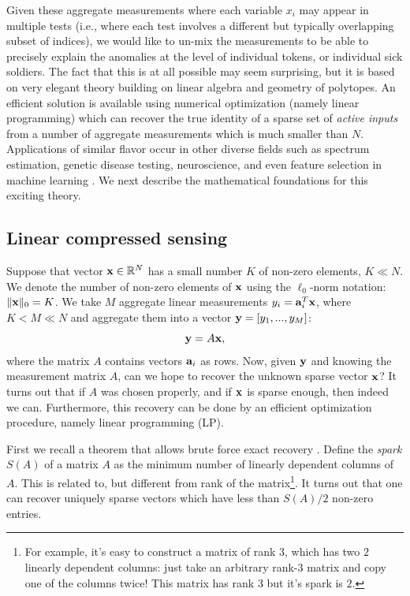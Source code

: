 Given these aggregate measurements where each variable $x_i$ may appear in multiple tests
(i.e., where each test involves a different but typically overlapping subset of indices), we would like to un-mix the
measurements to be able to precisely explain the anomalies at the level of individual tokens,
or individual sick soldiers.  The fact that this is at all possible may seem surprising, but it
is based on very elegant theory building on linear algebra and geometry of polytopes.  An
efficient solution is available using numerical optimization (namely linear programming) which
can recover the true identity of a sparse set of {\em active inputs} from a number of aggregate
measurements which is much smaller than $N$. Applications of similar flavor occur in
other diverse fields such as spectrum estimation, genetic disease testing, neuroscience, and even feature selection in machine learning \cite{rish2014sparse}. We next describe the mathematical foundations for this exciting theory.

\subsection{ Linear compressed sensing}

Suppose that  vector $\mathbf{x} \in \mathbb{R}^N$ has a small number $K$ of non-zero elements, $K \ll N$.
We denote the number of non-zero elements of $\mathbf{x}$ using the $\ell_0$-norm notation:
$\Vert \mathbf{x} \Vert_0 = K$.   We take $M$ aggregate linear measurements $y_i = \mathbf{a}_i^T \mathbf{x}$, where
$K < M \ll N$ and aggregate them into a vector $\mathbf{y} = [y_1, ..., y_M]$:
\begin{equation}
\mathbf{y} = A \mathbf{x},
\end{equation}
where the matrix $A$ contains vectors $\mathbf{a}_i$ as rows. Now, given $\mathbf{y}$ and knowing the
measurement matrix $A$, can we hope to recover the unknown
sparse vector $\mathbf{x}$?  It turns out that if $A$ was chosen properly, and if $\mathbf{x}$ is sparse
enough, then indeed we can. Furthermore, this recovery can be done by an efficient optimization
procedure, namely linear programming (LP).

First we recall a theorem that allows brute force exact recovery \cite{donoho_pnas}. Define the {\em spark}
$S(A)$ of a matrix $A$ as the minimum number of linearly dependent columns of $A$. This is related to,
but different from rank of the matrix\footnote{For example, it's easy to construct a matrix of rank
$3$, which has two $2$ linearly dependent columns: just take an arbitrary rank-$3$ matrix and
copy one of the columns twice! This matrix has rank $3$ but it's spark is $2$. }. It turns out that
one can recover uniquely sparse vectors which have less than $S(A) / 2$ non-zero entries.

